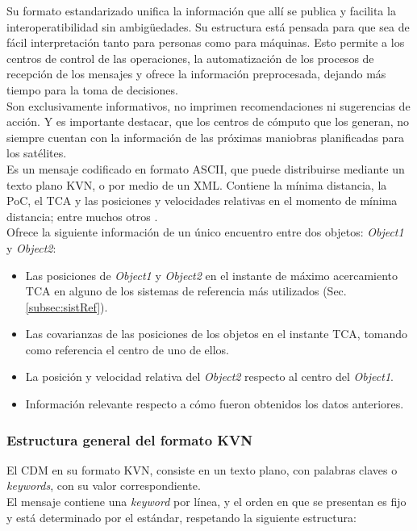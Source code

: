 Su formato estandarizado unifica la informaci\'on que all\'i se publica y facilita la interoperatibilidad sin ambig\"{u}edades. Su estructura est\'a pensada para que sea de f\'acil interpretaci\'on tanto para personas como para m\'aquinas. Esto permite a los centros de control de las operaciones, la automatizaci\'on de los procesos de recepci\'on de los mensajes y ofrece la informaci\'on preprocesada, dejando m\'as tiempo para la toma de decisiones.\\

Son exclusivamente informativos, no imprimen recomendaciones ni sugerencias de acci\'on.
Y es importante destacar, que los centros de c\'omputo que los generan, no siempre cuentan con la informaci\'on de las pr\'oximas maniobras planificadas para los sat\'elites.\\

Es un mensaje codificado en formato ASCII, que puede distribuirse mediante un texto plano \ac{KVN}, o por medio de un \ac{XML}. Contiene la m\'inima distancia, la PoC, el TCA y las posiciones y velocidades relativas en el momento de m\'inima distancia; entre muchos otros \citep{CDM}.\\

Ofrece la siguiente informaci\'on de un \'unico encuentro entre dos objetos: {\it{Object1}} y {\it{Object2}}:
\begin{itemize}
\item Las posiciones de  {\it{Object1}} y  {\it{Object2}} en el instante de m\'aximo acercamiento TCA en alguno de los sistemas de referencia m\'as utilizados (Sec. \ref{subsec:sistRef}).
\item Las covarianzas de las posiciones de los objetos en el instante TCA, tomando como referencia el centro de uno de ellos.
\item La posici\'on y velocidad relativa del {\it{Object2}} respecto al centro del {\it{Object1}}.
\item Informaci\'on relevante respecto a c\'omo fueron obtenidos los datos anteriores.
\end{itemize}


\subsubsection*{Estructura general del formato KVN}
El CDM en su formato KVN, consiste en un texto plano, con palabras claves o {\it{keywords}}, con su valor correspondiente.\\
El mensaje contiene una {\it{keyword}} por l\'inea, y el orden en que se presentan es fijo y est\'a determinado por el est\'andar, respetando la siguiente estructura:

